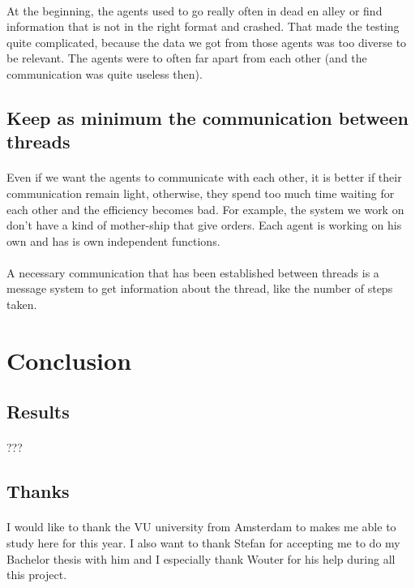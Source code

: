 \documentclass{article}
\begin{document}
	\paragraph{}
	At the beginning, the agents used to go really often in dead en alley
	or find information that is not in the right format and crashed.
	That made the testing quite complicated, because the data we got from those agents was too diverse to be relevant.
	The agents were to often far apart from each other (and the communication was quite useless then).
	\subsection{Keep as minimum the communication between threads}
	\paragraph{}
	Even if we want the agents to communicate with each other, it is better if their communication remain light,
	otherwise, they spend too much time waiting for each other and the efficiency becomes bad.
	For example, the system we work on don't have a kind of mother-ship that give orders.
	Each agent is working on his own and has is own independent functions.
	\paragraph{}
	A necessary communication that has been established between threads is a message system to get information about the thread,
	like the number of steps taken.

\newpage
\section{Conclusion}
	\subsection{Results}
	\paragraph{}
	???
	\subsection{Thanks}
	\paragraph{}
	I would like to thank the VU university from Amsterdam to makes me able to study here for this year.
	I also want to thank Stefan for accepting me to do my Bachelor thesis with him
	and I especially thank Wouter for his help during all this project.

\newpage


\end{document}
